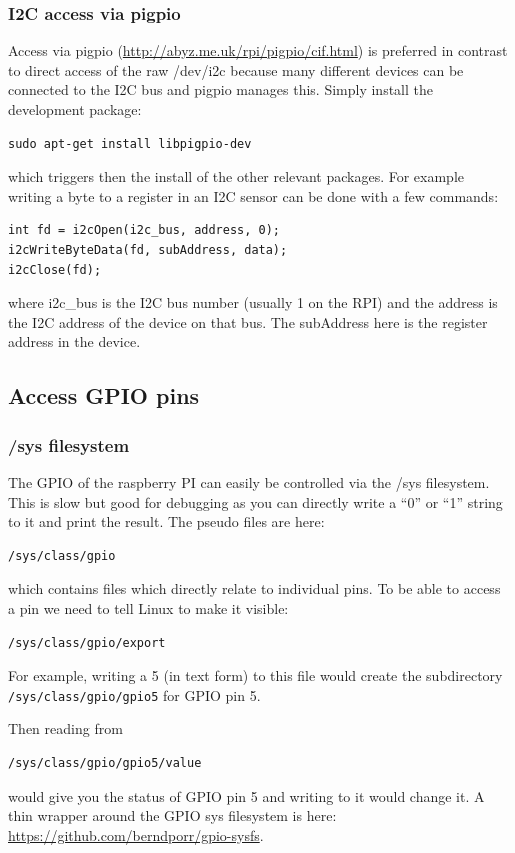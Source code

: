 \documentclass[12pt]{report}
\begin{document}
\subsubsection{I2C access via pigpio}
Access via pigpio (\url{http://abyz.me.uk/rpi/pigpio/cif.html})
is preferred in contrast to direct
access of the raw /dev/i2c because many different devices
can be connected to the I2C bus and pigpio manages this.
Simply install the development package:
\begin{verbatim}
sudo apt-get install libpigpio-dev
\end{verbatim}
which triggers then the install of the other relevant packages.
For example writing a byte to a register in an I2C sensor can be done with a
few commands:
\begin{verbatim}
int fd = i2cOpen(i2c_bus, address, 0);
i2cWriteByteData(fd, subAddress, data);
i2cClose(fd);
\end{verbatim}
where i2c\_bus is the I2C bus number (usually 1 on the RPI)
and the address is the I2C address of the device on that bus.
The subAddress here is the register address in the device.

\subsection{Access GPIO pins}
\subsubsection{/sys filesystem}
The GPIO of the raspberry PI can easily be controlled via
the /sys filesystem. This is slow but good for
debugging as you can directly write a
``0'' or ``1'' string to it and print the result. The
pseudo files are here:
\begin{verbatim}
/sys/class/gpio
\end{verbatim}
which contains files which directly relate to individual pins.
To be able to access a pin we need to tell Linux to make
it visible:
\begin{verbatim}
/sys/class/gpio/export
\end{verbatim}
For example, writing a 5 (in text form) to this file would
create the subdirectory \texttt{/sys/class/gpio/gpio5} for GPIO pin 5.

Then reading from
\begin{verbatim}
/sys/class/gpio/gpio5/value
\end{verbatim}
would give you the status of GPIO pin 5 and writing
to it would change it.
A thin wrapper around the GPIO sys filesystem is here: \url{https://github.com/berndporr/gpio-sysfs}.
\end{document}
